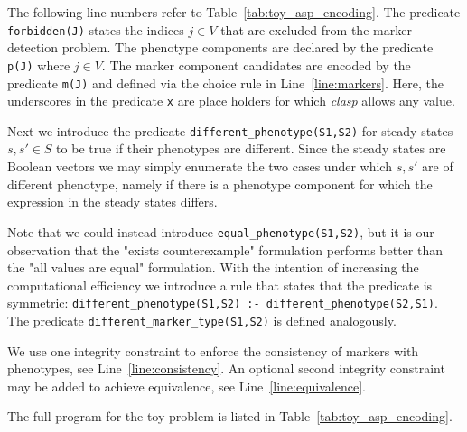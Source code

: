 \documentclass[11pt]{article}
\begin{document}
    The following line numbers refer to Table~\ref{tab:toy_asp_encoding}.
    The predicate \verb+forbidden(J)+ states the indices $j \in V$ that are excluded from the marker detection problem.
    The phenotype components are declared by the predicate \verb+p(J)+ where $j \in V$.
    The marker component candidates are encoded by the predicate \verb+m(J)+ and defined via the choice rule in Line~\ref{line:markers}.
    Here, the underscores in the predicate \verb+x+ are place holders for which \emph{clasp} allows any value.

    Next we introduce the predicate \verb+different_phenotype(S1,S2)+ for steady states $s, s' \in S$ to be true if their phenotypes are different.
    Since the steady states are Boolean vectors we may simply enumerate the two cases under which $s, s'$ are of different phenotype, namely if there is a phenotype component for which the expression in the steady states differs.

    Note that we could instead introduce \verb+equal_phenotype(S1,S2)+, but it is our observation that the "exists counterexample" formulation performs better than the "all values are equal" formulation.
    With the intention of increasing the computational efficiency we introduce a rule that states that the predicate is symmetric: \verb+different_phenotype(S1,S2) :- different_phenotype(S2,S1)+.
    The predicate \verb+different_marker_type(S1,S2)+ is defined analogously.

    We use one integrity constraint to enforce the consistency of markers with phenotypes, see Line~\ref{line:consistency}.
    An optional second integrity constraint may be added to achieve equivalence, see Line~\ref{line:equivalence}.

    The full program for the toy problem is listed in Table~\ref{tab:toy_asp_encoding}.
\end{document}
